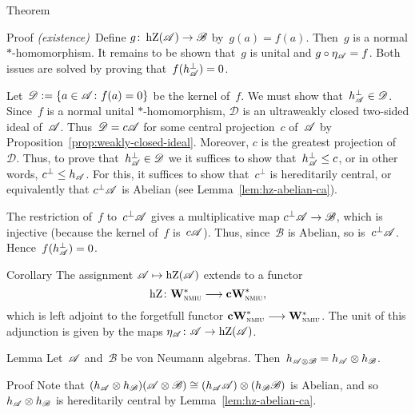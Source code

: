 \documentclass[a]{subfiles}
\begin{document}
\begin{parsec}
\begin{point}{Theorem}
\begin{point}{Proof}
\emph{(existence)}\ 
Define $g\colon \operatorname{hZ}(\mathscr{A})\to \mathscr{B}$
by~$g(a)=f(a)$.  Then~$g$ is a normal $*$-homomorphism.
It remains to be shown that~$g$ is unital and $g\circ \eta_{\mathscr{A}} = f$.
Both issues are solved by proving that~$f(h_{\mathscr{A}}^\perp)=0$.

Let~$\mathscr{D}:=\{a\in \mathscr{A}\colon f(a)=0\}$
be the kernel of~$f$.
We must show that~$h_{\mathscr{A}}^\perp \in \mathscr{D}$.
Since~$f$ is a normal unital $*$-homomorphism,
$\mathscr{D}$ is an ultraweakly closed two-sided ideal of~$\mathscr{A}$.
Thus~$\mathscr{D} = c\mathscr{A}$
for some central projection~$c$ of~$\mathscr{A}$
by Proposition~\ref{prop:weakly-closed-ideal}.
Moreover, $c$ is the greatest projection of~$\mathscr{D}$.
Thus, to prove that~$h_{\mathscr{A}}^\perp \in\mathscr{D}$
we it suffices to show that~$h_{\mathscr{A}}^\perp \leq c$,
or in other words, $c^\perp \leq h_{\mathscr{A}}$.
For this, it suffices to show that~$c^\perp$
is hereditarily central,
or equivalently that $c^\perp\mathscr{A}$
is Abelian (see Lemma~\ref{lem:hz-abelian-ca}).

The restriction of~$f$ to~$c^\perp\mathscr{A}$
gives a multiplicative map $c^\perp\mathscr{A} \to\mathscr{B}$,
which is injective (because the kernel of~$f$ is~$c\mathscr{A}$).
Thus, since~$\mathscr{B}$ is Abelian, so is~$c^\perp \mathscr{A}$.
Hence~$f(h_{\mathscr{A}}^\perp)=0$.
\end{point}
\end{point}
\begin{point}{Corollary}%
The assignment $\mathscr{A}\mapsto \operatorname{hZ}(\mathscr{A})$
extends to 
a functor 
\begin{equation*}
\operatorname{hZ}\colon \mathbf{W}^*_{\text{\textsc{nmiu}}}\longrightarrow \mathbf{cW}^*_{\text{\textsc{nmiu}}},
\end{equation*}
which is left adjoint
to the forgetfull functor $\mathbf{cW}^*_{\text{\textsc{nmiu}}}\longrightarrow \mathbf{W}^*_{\text{\textsc{nmiu}}}$.
The unit of this adjunction
is given by the maps $\eta_{\mathscr{A}}
\colon \mathscr{A}\to\operatorname{hZ}(\mathscr{A})$.
\end{point}
\begin{point}{Lemma}%
Let~$\mathscr{A}$ and~$\mathscr{B}$
be von Neumann algebras.
Then~$h_{\mathscr{A}\otimes\mathscr{B}}=
h_{\mathscr{A}}\otimes h_\mathscr{B}$.
\begin{point}{Proof}%
Note that $(h_{\mathscr{A}} \otimes h_\mathscr{B})(
\mathscr{A}\otimes\mathscr{B})
\cong (h_{\mathscr{A}}\mathscr{A})\otimes(h_\mathscr{B}\mathscr{B})$
is Abelian,
and so $h_{\mathscr{A}}\otimes h_\mathscr{B}$
is hereditarily central
by Lemma~\ref{lem:hz-abelian-ca}.


\end{point}
\end{point}
\end{parsec}
\end{document}
